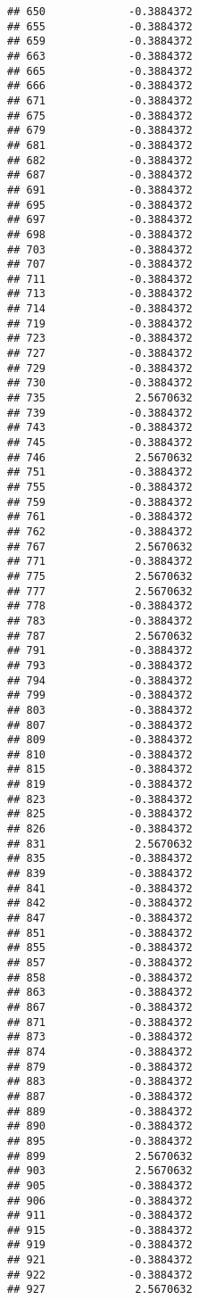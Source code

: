 \documentclass[
]{article}
\begin{document}
\begin{verbatim}
## 650             -0.3884372
## 655             -0.3884372
## 659             -0.3884372
## 663             -0.3884372
## 665             -0.3884372
## 666             -0.3884372
## 671             -0.3884372
## 675             -0.3884372
## 679             -0.3884372
## 681             -0.3884372
## 682             -0.3884372
## 687             -0.3884372
## 691             -0.3884372
## 695             -0.3884372
## 697             -0.3884372
## 698             -0.3884372
## 703             -0.3884372
## 707             -0.3884372
## 711             -0.3884372
## 713             -0.3884372
## 714             -0.3884372
## 719             -0.3884372
## 723             -0.3884372
## 727             -0.3884372
## 729             -0.3884372
## 730             -0.3884372
## 735              2.5670632
## 739             -0.3884372
## 743             -0.3884372
## 745             -0.3884372
## 746              2.5670632
## 751             -0.3884372
## 755             -0.3884372
## 759             -0.3884372
## 761             -0.3884372
## 762             -0.3884372
## 767              2.5670632
## 771             -0.3884372
## 775              2.5670632
## 777              2.5670632
## 778             -0.3884372
## 783             -0.3884372
## 787              2.5670632
## 791             -0.3884372
## 793             -0.3884372
## 794             -0.3884372
## 799             -0.3884372
## 803             -0.3884372
## 807             -0.3884372
## 809             -0.3884372
## 810             -0.3884372
## 815             -0.3884372
## 819             -0.3884372
## 823             -0.3884372
## 825             -0.3884372
## 826             -0.3884372
## 831              2.5670632
## 835             -0.3884372
## 839             -0.3884372
## 841             -0.3884372
## 842             -0.3884372
## 847             -0.3884372
## 851             -0.3884372
## 855             -0.3884372
## 857             -0.3884372
## 858             -0.3884372
## 863             -0.3884372
## 867             -0.3884372
## 871             -0.3884372
## 873             -0.3884372
## 874             -0.3884372
## 879             -0.3884372
## 883             -0.3884372
## 887             -0.3884372
## 889             -0.3884372
## 890             -0.3884372
## 895             -0.3884372
## 899              2.5670632
## 903              2.5670632
## 905             -0.3884372
## 906             -0.3884372
## 911             -0.3884372
## 915             -0.3884372
## 919             -0.3884372
## 921             -0.3884372
## 922             -0.3884372
## 927              2.5670632

\end{verbatim}
\end{document}
